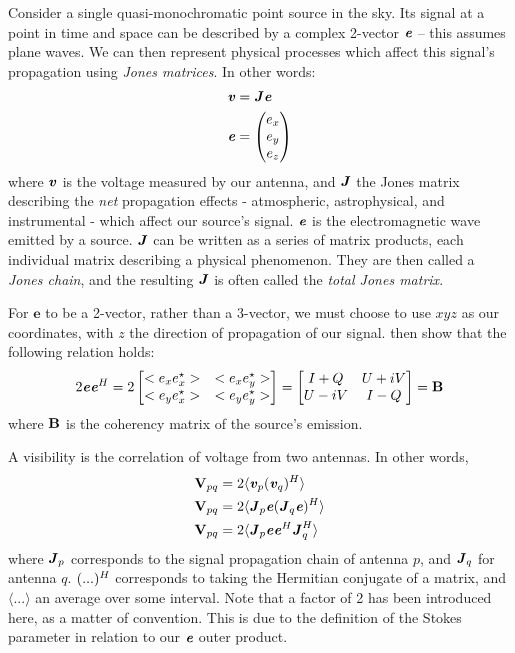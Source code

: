 \pg
Consider a single quasi-monochromatic point source in the sky. Its signal at a point in time and space can be described by a complex 2-vector $\evector$ -- this assumes plane waves. We can then represent physical processes which affect this signal's propagation using \emph{Jones matrices}. In other words:
\begin{align}
\volt &= \Jones\evector\\
\evector &= \begin{pmatrix} e_x \\ e_y \\ e_z \end{pmatrix}
\end{align}
where $\volt$ is the voltage measured by our antenna, and $\Jones$ the Jones matrix describing the \emph{net} propagation effects - atmospheric, astrophysical, and instrumental - which affect our source's signal. $\evector$ is the electromagnetic wave emitted by a source. $\Jones$ can be written as a series of matrix products, each individual matrix describing a physical phenomenon. They are then called a \emph{Jones chain}, and the resulting $\Jones$ is often called the \emph{total Jones matrix}.

\pg
For $\mathbf{e}$ to be a 2-vector, rather than a 3-vector, we must choose to use $xyz$ as our coordinates, with $z$ the direction of propagation of our signal.  then show that the following relation holds:
\begin{equation}
2 \evector \evector^\Herm = 2  \begin{bmatrix} <e_x e_x^\star> & <e_x e_y^\star> \\ <e_y e_x^\star> & <e_y e_y^\star> \end{bmatrix} = \begin{bmatrix} I+Q & U+iV \\ U-iV & I-Q \end{bmatrix} = \Bmatrix
\end{equation}
where $\Bmatrix$ is the coherency matrix of the source's emission.

\pg
A visibility is the correlation of voltage from two antennas. In other words,
\begin{align}
\Vis_{pq} &= 2 \langle\volt_p (\volt_q)^\Herm\rangle\\
\Vis_{pq} &= 2 \langle\Jones_p \evector (\Jones_q \evector)^\Herm\rangle\\
\Vis_{pq} &= 2 \langle\Jones_p \evector \evector^\Herm \Jones_q^\Herm\rangle
\end{align}
where $\Jones_p$ corresponds to the signal propagation chain of antenna $p$, and $\Jones_q$ for antenna $q$. $(...)^\Herm$ corresponds to taking the Hermitian conjugate of a matrix, and $\langle...\rangle$ an average over some interval. Note that a factor of 2 has been introduced here, as a matter of convention. This is due to the definition of the Stokes parameter in relation to our $\evector$ outer product.



